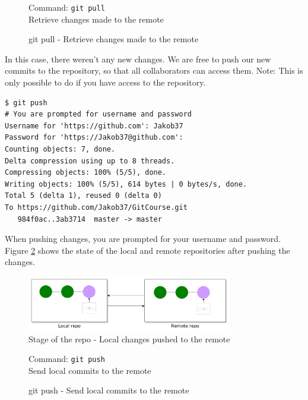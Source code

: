 \documentclass[../main/git_course_main.tex]{subfiles}
\begin{document}
\begin{figure}
\begin{bluebox}
Command: \verb$git pull$ \\

Retrieve changes made to the remote
\end{bluebox}
\label{command:pull}
\caption{git pull - Retrieve changes made to the remote}
\end{figure}

In this case, there weren't any new changes. We are free to push our new commits to the repository, so that all collaborators can access them. Note: This is only possible to do if you have access to the repository.

\begin{codebox}
\begin{lstlisting}
$ git push
# You are prompted for username and password
Username for 'https://github.com': Jakob37
Password for 'https://Jakob37@github.com': 
Counting objects: 7, done.
Delta compression using up to 8 threads.
Compressing objects: 100% (5/5), done.
Writing objects: 100% (5/5), 614 bytes | 0 bytes/s, done.
Total 5 (delta 1), reused 0 (delta 0)
To https://github.com/Jakob37/GitCourse.git
   984f0ac..3ab3714  master -> master
\end{lstlisting}
\end{codebox}

When pushing changes, you are prompted for your username and password.
Figure \ref{fig:changes_pushed} shows the state of the local and remote repositories after pushing the changes.

\begin{figure}[h!]
	\centering
	\includegraphics[width=0.8\textwidth]{../visualizations/chapter5/54_changes_pushed.pdf}
	\caption{Stage of the repo - Local changes pushed to the remote}
	\label{fig:changes_pushed}
\end{figure}

\begin{figure}
\begin{bluebox}
Command: \verb$git push$ \\

Send local commits to the remote
\end{bluebox}
\label{command:pull}
\caption{git push - Send local commits to the remote}
\end{figure}
\end{document}

